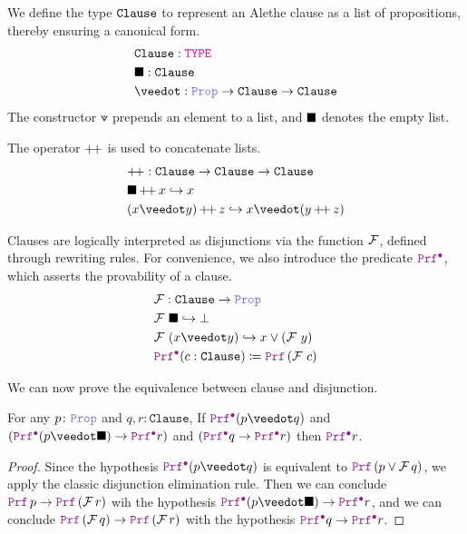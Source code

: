\begin{definition}\label{def:encoding-clause}
We define the type $\kw{Clause}$ to represent an Alethe clause as a list of propositions, thereby ensuring a canonical form.
\begin{align*}
&\texttt{Clause}: \type \\
&\nil: \texttt{Clause} \\
&\veedot: \prop \ra \texttt{Clause}  \ra \texttt{Clause}
\end{align*}
The constructor $\veedot$ prepends an element to a list, and $\nil$ denotes the empty list.
\end{definition}

\begin{definition}
The operator $\pp$ is used to concatenate lists. 
\begin{align*}
& \pp: \texttt{Clause} \ra \texttt{Clause} \ra \texttt{Clause} \\
& \nil \mathop{\pp} x \re x \\
& (x \veedot y) \mathop{\pp} z \re x \veedot (y \mathop{\pp} z)
\end{align*}
\end{definition}

\begin{definition}
Clauses are logically interpreted as disjunctions via the function $\cal{F}$, defined through rewriting rules. For convenience, we also introduce the predicate $\pid$, which asserts the provability of a clause.
\begin{align*}
& \cal{F}: \texttt{Clause} \ra \prop \\
& \cal{F}~\nil \re \bot\\
& \cal{F}~(x \veedot y) \re x \lor (\cal{F}~y) \\
& \pid (c : \texttt{Clause}) \coloneqq \prf\,(\cal{F}~c)
\end{align*}
\end{definition}

We can now prove the equivalence between clause and disjunction.

\begin{lemma}\label{lemma:clause-elim}
For any $p \colon \prop$ and $q,r \colon \texttt{Clause}$, If $\pid (p \veedot q)$ and $(\pid (p \veedot \nil) \ra  \pid r)$ and $(\pid q \ra  \pid r)$ then $\pid r$.
\end{lemma}
\begin{proof}
Since the hypothesis $\pid (p \veedot q)$ is equivalent to $\prf\,(p \lor \cal{F}\,q)$, we apply the classic disjunction elimination rule.
Then we can conclude $\prf\,p \ra \prf\,(\cal{F}\,r)$ wih the hypothesis $\pid (p \veedot \nil) \ra  \pid r$, and we can conclude $\prf\,(\cal{F}\,q) \ra \prf\,(\cal{F}\,r)$
with the hypothesis $\pid q \ra  \pid r$.
\end{proof}

